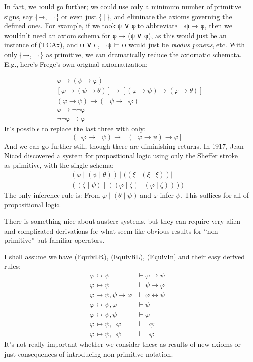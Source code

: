 \documentclass[12pt]{report}
\theoremstyle{nonumberplain}
\begin{document}
In fact, we could go further; we could use only a minimum number of primitive signs, say \{→, ¬\,\} or even just \{\,|\,\}, and eliminate the axioms governing the defined ones. For example, if we took ψ ∨ φ to abbreviate ¬ψ → φ, then we wouldn't need an axiom schema for φ → (ψ ∨ φ), as this would just be an instance of (TCAx), and ψ ∨ φ, ¬ψ ⊢ φ would just be \emph{modus ponens}, etc. With only \{→, ¬\,\} as primitive, we can dramatically reduce the axiomatic schemata. E.g., here's Frege's own original axiomatization:

\begin{align*}
&φ → (ψ → φ)\\
&[φ → (ψ → θ)] → [(φ → ψ) → (φ → θ)]\\
&(φ → ψ) → (¬ψ → ¬φ)\\
&φ → ¬¬φ\\
&¬¬φ → φ
\end{align*}
It's possible to replace the last three with only:
\[
(¬φ → ¬ψ) → [(¬φ → ψ) → φ]
\]
\noindent And we can go further still, though there are diminishing returns. In 1917, Jean Nicod discovered a system for propositional logic using only the Sheffer stroke $\mathrel{|}$ as primitive, with the single schema:
\begin{multline*}
(φ\mathrel{|}(ψ \mathrel{|}θ))\mathrel{|}((ξ \mathrel{|}(ξ \mathrel{|}ξ ))\mathrel{|}\\((ζ \mathrel{|}ψ )\mathrel{|}((φ\mathrel{|}ζ )\mathrel{|}(φ\mathrel{|}ζ ))))
\end{multline*}
The only inference rule is: From $φ \mathrel{|} (θ \mathrel{|} ψ)$ and $φ$ infer $ψ$. This suffices for all of propositional logic.

There is something nice about austere systems, but they can require very alien and complicated derivations for what seem like obvious results for ``non-primitive'' but familiar operators.

I shall assume we have (EquivLR), (EquivRL), (EquivIn) and their easy derived rules:%
\label{equiv:rules}%
\begin{align}
φ ↔ ψ &⊢ φ → ψ \tag{BE}\\
φ ↔ ψ &⊢ ψ → φ \tag{BE}\\
φ → ψ, ψ → φ &⊢ φ ↔ ψ \tag{BI}\\
φ ↔ ψ, φ &⊢ ψ \tag{BMP}\\
φ ↔ ψ, ψ &⊢ φ \tag{BMP}\\
φ ↔ ψ, ¬φ &⊢ ¬ψ \tag{BMT}\\
φ ↔ ψ, ¬ψ &⊢ ¬φ \tag{BMT}
\end{align}
It's not really important whether we consider these as results of new axioms or just consequences of introducing non-primitive notation.
\end{document}
